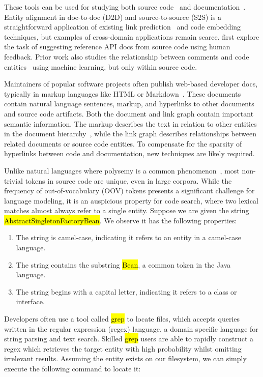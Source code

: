 \documentclass{article}
\newcommand*{\tinline}[1]{{\sethlcolor{slightgray}\ttfamily\footnotesize\relax\hl{#1}}}
\begin{document}
These tools can be used for studying both source code~\citep{allamanis2017learning}  and documentation~\citep{yang2016hierarchical}. Entity alignment in doc-to-doc (D2D) and source-to-source (S2S) is a straightforward application of existing link prediction~\citep{zhang2018link} and code embedding~\citep{gu2018deep} techniques, but examples of cross-domain applications remain scarce. \citet{robillard2015recommending, robillard2017demand} first explore the task of suggesting reference API docs from source code using human feedback. Prior work also studies the relationship between comments and code entities~\citep{iyer2018mapping, panthaplackel2020associating} using machine learning, but only within source code.

Maintainers of popular software projects often publish web-based developer docs, typically in markup languages like HTML or Markdown~\citep{terrasa2018using}. These documents contain natural language sentences, markup, and hyperlinks to other documents and source code artifacts. Both the document and link graph contain important semantic information. The markup describes the text in relation to other entities in the document hierarchy~\citep{yang2016hierarchical}, while the link graph describes relationships between related documents or source code entities. To compensate for the sparsity of hyperlinks between code and documentation, new techniques are likely required.

Unlike natural languages where polysemy is a common phenomenon~\citep{ganea2016probabilistic}, most non-trivial tokens in source code are unique, even in large corpora. While the frequency of out-of-vocabulary (OOV) tokens presents a significant challenge for language modeling, it is an auspicious property for code search, where two lexical matches almost always refer to a single entity. Suppose we are given the string \tinline{AbstractSingletonFactoryBean}. We observe it has the following properties:

\begin{enumerate}
    \item The string is camel-case, indicating it refers to an entity in a camel-case language.
    \item The string contains the substring \tinline{Bean}, a common token in the Java language.
    \item The string begins with a capital letter, indicating it refers to a class or interface.
\end{enumerate}

Developers often use a tool called \tinline{grep} to locate files, which accepts queries written in the regular expression (regex) language, a domain specific language for string parsing and text search. Skilled \tinline{grep} users are able to rapidly construct a regex which retrieves the target entity with high probability whilst omitting irrelevant results. Assuming the entity exists on our filesystem, we can simply execute the following command to locate it:
\end{document}

